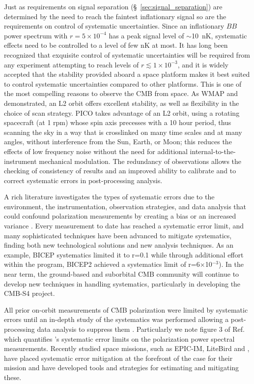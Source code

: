 \documentclass[PICOReport.tex]{subfiles}
\begin{document}
Just as requirements on signal separation (\S~\ref{sec:signal_separation}) are determined by the need to reach the faintest inflationary signal so are the requirements on control of systematic uncertainties. Since an inflationary $BB$ power spectrum with $r = 5 \times 10^{-4}$ has a peak signal level of $\sim$10~nK, systematic effects need to be controlled to a level of few nK at most. It has long been recognized that exquisite control of systematic uncertainties will be required from any experiment attempting to reach levels of $r \lesssim 1\times 10^{-3}$, and it is widely accepted that the stability provided aboard a space platform makes it best suited to control systematic uncertainties compared to other platforms. This is one of the most compelling reasons to observe the CMB from space.  As WMAP and \planck~ demonstrated, an L2 orbit offers excellent stability, as well as flexibility in the choice of scan strategy.  PICO takes advantage of an L2 orbit, using a rotating spacecraft (at 1 rpm) whose spin axis precesses with a 10 hour period, thus scanning the sky in a way that is crosslinked on many time scales and at many angles, without interference from the Sun, Earth, or Moon; this reduces the effects of low frequency noise without the need for additional internal-to-the-instrument mechanical modulation. The redundancy of observations allows the checking of consistency of results and an improved ability to calibrate and to correct systematic errors in post-processing analysis.

A rich literature investigates the types of systematic errors due to the environment, the instrumentation, observation strategies, and data analysis that could confound polarization measurements by creating a bias or an increased variance \cite{hu03,shimon2008,yadav2010,Griffiths2014,LFI_systematics,Kaplan2002,Miller2009,Pagano2009}. Every measurement to date has  reached a systematic error limit, 
and many sophisticated techniques have been advanced to mitigate systematics, finding both new technological solutions and new analysis techniques. As an example, BICEP systematics limited it to r=0.1\cite{Takahashi2010} while through additional effort within the program, BICEP2 achieved a systematics limit of r=6$\times$10$^{-3}$\cite{BICEP2_III}). In the near term, the ground-based and suborbital CMB community will continue to develop new techniques in handling systematics, particularly in developing the CMB-S4 project.

All prior on-orbit measurements of CMB polarization were limited by systematic errors until an in-depth study of the systematics was performed allowing a post-processing data analysis to suppress them \cite{Bennett13,planck2016_xlvi,Planck2018_I}. Particularly we note figure 3 of Ref.\cite{Planck2018_I} which quantifies \planck's systematic error limits on the polarization power spectral measurements. Recently studied space missions, such as EPIC-IM, LiteBird and  \core, have placed systematic error mitigation at the forefront of the case for their mission and have developed tools and strategies for estimating and mitigating these\cite{hazumi2012,wallis2017,Natoli2018}.
\end{document}
